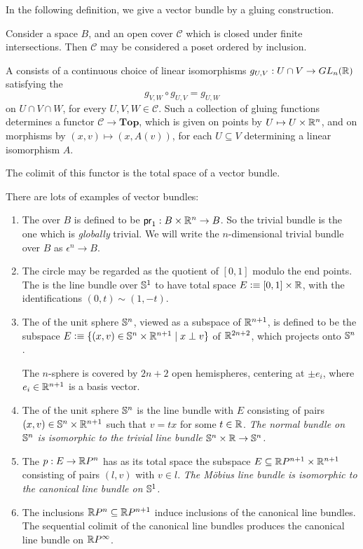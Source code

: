\documentclass{article}
\begin{document}
In the following definition, we give a vector bundle by a gluing construction.

\begin{defn}
Consider a space $B$, and an open cover $\mathcal{C}$ which is closed under
finite intersections. Then $\mathcal{C}$ may be considered a poset ordered by
inclusion.

A  consists of a continuous choice of linear 
isomorphisms $g_{U,V}:U\cap V\to GL_n(\mathbb{R})$ satisfying the  
\begin{equation*}
g_{V,W}\circ g_{U,V}=g_{U,W}
\end{equation*}
on $U\cap V\cap W$, for every 
$U,V,W\in\mathcal{C}$. Such a collection of gluing functions determines a functor
$\mathcal{C}\to\mathbf{Top}$, which is given on points by $U\mapsto U\times\mathbb{R}^n$,
and on morphisms by $(x,v)\mapsto(x,A(v))$, for each $U\subseteq V$ determining
a linear isomorphism $A$. 

The colimit of this functor is the total space of a vector bundle.
\end{defn}

\begin{eg}
There are lots of examples of vector bundles:
\begin{enumerate}
\item The  over $B$ is defined to be 
$\mathsf{pr}_{1}:B\times\mathbb{R}^n\to B$. So the trivial bundle is the one which is
\emph{globally} trivial. We will write the $n$-dimensional trivial bundle over
$B$ as $\epsilon^n\to B$. 
\item The circle may be regarded as the quotient of $[0,1]$ modulo the end points.
The  is the line bundle over $\mathbb{S}^1$ to have total space
$E\vcentcolon\equiv [0,1]\times\mathbb{R}$, with the identifications $(0,t)\sim(1,-t)$. 
\item The  of the unit sphere $\mathbb{S}^n$, viewed as a subspace of
$\mathbb{R}^{n+1}$, is defined to be the subspace $E\vcentcolon\equiv\{(x,v)\in\mathbb{S}^n\times\mathbb{R}^{n+1}
\mid x\perp v\}$ of $\mathbb{R}^{2n+2}$, which projects onto $\mathbb{S}^n$. 

The $n$-sphere is covered by $2n+2$ open hemispheres, centering at $\pm e_i$,
where $e_i\in\mathbb{R}^{n+1}$ is a basis vector. 
\item The  of the unit sphere $\mathbb{S}^n$ is the line bundle
with $E$ consisting of pairs $(x,v)\in\mathbb{S}^n\times\mathbb{R}^{n+1}$ such that $v=tx$ for
some $t\in\mathbb{R}$. \emph{The normal bundle on $\mathbb{S}^n$ is isomorphic to the trivial line 
bundle $\mathbb{S}^n\times\mathbb{R}\to\mathbb{S}^n$.}
\item The  $p:E\to \mathbb{R} P^n$ has as its total space
the subspace $E\subseteq \mathbb{R} P^{n+1}\times\mathbb{R} ^{n+1}$ consisting of pairs
$(l,v)$ with $v\in l$. \emph{The M\"obius line bundle is isomorphic to the
canonical line bundle on $\mathbb{S}^1$.}
\item The inclusions $\mathbb{R} P^n\subseteq \mathbb{R} P^{n+1}$ induce inclusions of the
canonical line bundles. The sequential colimit of the canonical line bundles
produces the canonical line bundle on $\mathbb{R} P^\infty$. 
\end{enumerate}
\end{eg}
\end{document}
